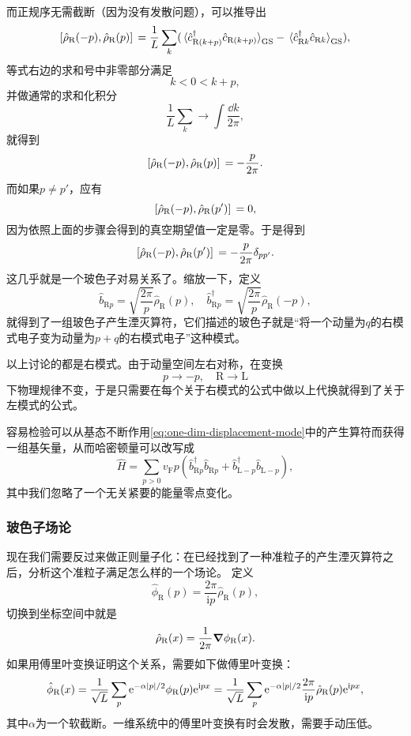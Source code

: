 \documentclass[hyperref, UTF8, a4paper]{ctexart}
\newcommand*{\ii}{\mathrm{i}}
\newcommand*{\ee}{\mathrm{e}}
\begin{document}
而正规序无需截断（因为没有发散问题），可以推导出
\[
    \comm*{\hat{\rho}_\text{R}(- p)}{\hat{\rho}_\text{R}(p)} = \frac{1}{L} \sum_{k} (\expval*{\hat{c}^\dagger_{\text{R} (k + p)} \hat{c}_{\text{R} (k + p)}}_\text{GS} - \expval*{\hat{c}^\dagger_{\text{R} k} \hat{c}_{\text{R} k}}_\text{GS}),
\]
等式右边的求和号中非零部分满足
\[
    k < 0 < k + p,
\]
并做通常的求和化积分
\[
    \frac{1}{L} \sum_k \longrightarrow \int \frac{\dd{k}}{2\pi},
\]
就得到
\[
    \comm*{\hat{\rho}_\text{R}(- p)}{\hat{\rho}_\text{R}(p)} = - \frac{p}{2\pi}.
\]
而如果$p \neq p'$，应有
\[
    \comm*{\hat{\rho}_\text{R}(- p)}{\hat{\rho}_\text{R}(p')} = 0,
\]
因为依照上面的步骤会得到的真空期望值一定是零。于是得到
\begin{equation}
    \comm*{\hat{\rho}_\text{R}(- p)}{\hat{\rho}_\text{R}(p')} = - \frac{p}{2\pi} \delta_{pp'}.
\end{equation}
这几乎就是一个玻色子对易关系了。缩放一下，定义
\begin{equation}
    \hat{b}_{\text{R} p} = \sqrt{\frac{2\pi}{p}} \hat{\rho}_\text{R}(p), \quad \hat{b}^\dagger_{\text{R} p} = \sqrt{\frac{2\pi}{p}} \hat{\rho}_\text{R}(-p),
    \label{eq:one-dim-displacement-mode}
\end{equation}
就得到了一组玻色子产生湮灭算符，它们描述的玻色子就是“将一个动量为$q$的右模式电子变为动量为$p+q$的右模式电子”这种模式。

以上讨论的都是右模式。由于动量空间左右对称，在变换
\[
    p \longrightarrow -p, \quad \text{R} \longrightarrow \text{L}
\]
下物理规律不变，于是只需要在每个关于右模式的公式中做以上代换就得到了关于左模式的公式。

容易检验可以从基态不断作用\eqref{eq:one-dim-displacement-mode}中的产生算符而获得一组基矢量，从而哈密顿量可以改写成
\begin{equation}
    \hat{H} = \sum_{p > 0} v_\text{F} p \left(\hat{b}_{\text{R} p}^\dagger \hat{b}_{\text{R} p} + \hat{b}_{\text{L} -p}^\dagger \hat{b}_{\text{L} -p} \right),
    \label{eq:one-dim-displacement-hamiltonian}
\end{equation}
其中我们忽略了一个无关紧要的能量零点变化。

\subsubsection{玻色子场论}

现在我们需要反过来做正则量子化：在已经找到了一种准粒子的产生湮灭算符之后，分析这个准粒子满足怎么样的一个场论。
定义
\begin{equation}
    \hat{\phi}_\text{R}(p) = \frac{2\pi}{\ii p} \hat{\rho}_\text{R}(p),
    \label{eq:one-dim-phi}
\end{equation}
切换到坐标空间中就是
\[
    \hat{\rho}_\text{R}(x) = \frac{1}{2\pi} \grad \phi_\text{R}(x).
\]
如果用傅里叶变换证明这个关系，需要如下做傅里叶变换：
\begin{equation}
    \hat{\phi}_\text{R} (x) = \frac{1}{\sqrt{L}} \sum_p \ee^{- \alpha \abs{p} / 2} \phi_\text{R}(p) \ee^{\ii p x} = \frac{1}{\sqrt{L}} \sum_p \ee^{- \alpha \abs{p} / 2} \frac{2\pi}{\ii p} \hat{\rho}_\text{R}(p) \ee^{\ii p x},
    \label{eq:one-dim-phi-and-rho}
\end{equation}
其中$\alpha$为一个软截断。一维系统中的傅里叶变换有时会发散，需要手动压低。
\end{document}
